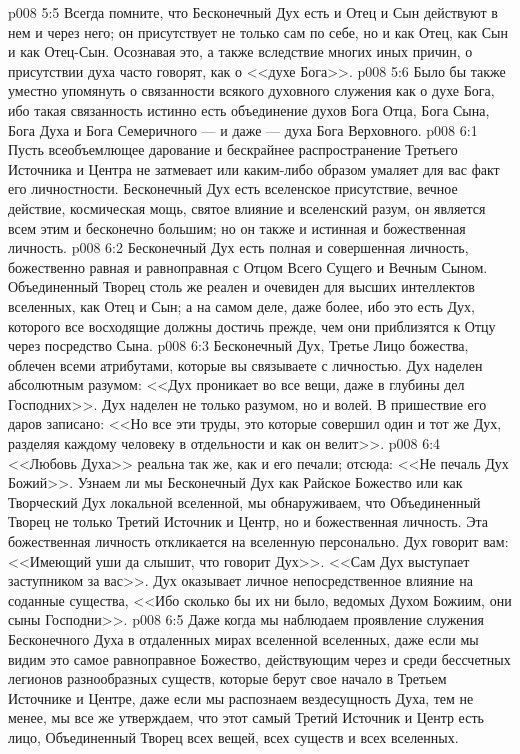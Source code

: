 \vs p008 5:5 Всегда помните, что Бесконечный Дух есть  и Отец и Сын действуют в нем и через него; он присутствует не только сам по себе, но и как Отец, как Сын и как Отец\hyp{}Сын. Осознавая это, а также вследствие многих иных причин, о присутствии духа часто говорят, как о <<духе Бога>>.
\vs p008 5:6 Было бы также уместно упомянуть о связанности всякого духовного служения как о духе Бога, ибо такая связанность истинно есть объединение духов Бога Отца, Бога Сына, Бога Духа и Бога Семеричного --- и даже --- духа Бога Верховного.
\vs p008 6:1 Пусть всеобъемлющее дарование и бескрайнее распространение Третьего Источника и Центра не затмевает или каким\hyp{}либо образом умаляет для вас факт его личностности. Бесконечный Дух есть вселенское присутствие, вечное действие, космическая мощь, святое влияние и вселенский разум, он является всем этим и бесконечно большим; но он также и истинная и божественная личность.
\vs p008 6:2 Бесконечный Дух есть полная и совершенная личность, божественно равная и равноправная с Отцом Всего Сущего и Вечным Сыном. Объединенный Творец столь же реален и очевиден для высших интеллектов вселенных, как Отец и Сын; а на самом деле, даже более, ибо это есть Дух, которого все восходящие должны достичь прежде, чем они приблизятся к Отцу через посредство Сына.
\vs p008 6:3 Бесконечный Дух, Третье Лицо божества, облечен всеми атрибутами, которые вы связываете с личностью. Дух наделен абсолютным разумом: <<Дух проникает во все вещи, даже в глубины дел Господних>>. Дух наделен не только разумом, но и волей. В пришествие его даров записано: <<Но все эти труды, это которые совершил один и тот же Дух, разделяя каждому человеку в отдельности и как он велит>>.
\vs p008 6:4 <<Любовь Духа>> реальна так же, как и его печали; отсюда: <<Не печаль Дух Божий>>. Узнаем ли мы Бесконечный Дух как Райское Божество или как Творческий Дух локальной вселенной, мы обнаруживаем, что Объединенный Творец не только Третий Источник и Центр, но и божественная личность. Эта божественная личность откликается на вселенную персонально. Дух говорит вам: <<Имеющий уши да слышит, что говорит Дух>>. <<Сам Дух выступает заступником за вас>>. Дух оказывает личное непосредственное влияние на соданные существа, <<Ибо сколько бы их ни было, ведомых Духом Божиим, они сыны Господни>>.
\vs p008 6:5 Даже когда мы наблюдаем проявление служения Бесконечного Духа в отдаленных мирах вселенной вселенных, даже если мы видим это самое равноправное Божество, действующим через и среди бессчетных легионов разнообразных существ, которые берут свое начало в Третьем Источнике и Центре, даже если мы распознаем вездесущность Духа, тем не менее, мы все же утверждаем, что этот самый Третий Источник и Центр есть лицо, Объединенный Творец всех вещей, всех существ и всех вселенных.
